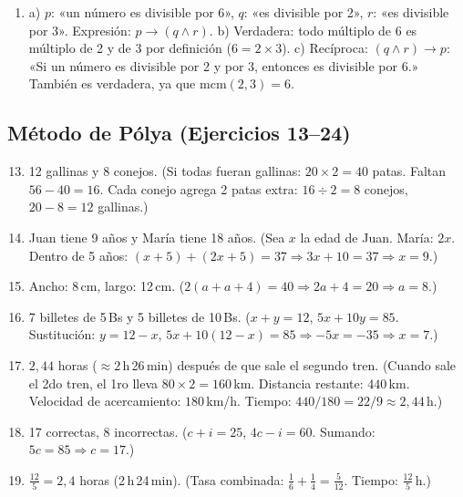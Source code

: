 \documentclass[12pt, a4paper]{article}
\begin{document}
\begin{enumerate}[leftmargin=*, label=\textbf{\arabic*.}]
  \item a) $p$: «un número es divisible por 6», $q$: «es divisible por 2», $r$: «es divisible por 3». Expresión: $p \rightarrow (q \wedge r)$. \quad b) Verdadera: todo múltiplo de 6 es múltiplo de 2 y de 3 por definición ($6 = 2 \times 3$). \quad c) Recíproca: $(q \wedge r) \rightarrow p$: «Si un número es divisible por 2 y por 3, entonces es divisible por 6.» También es verdadera, ya que $\text{mcm}(2,3) = 6$.
\end{enumerate}

\subsection*{Método de Pólya (Ejercicios 13--24)}

\begin{enumerate}[leftmargin=*, label=\textbf{\arabic*.}]
  \setcounter{enumi}{12}
  \item 12 gallinas y 8 conejos. (Si todas fueran gallinas: $20 \times 2 = 40$ patas. Faltan $56 - 40 = 16$. Cada conejo agrega 2 patas extra: $16 \div 2 = 8$ conejos, $20 - 8 = 12$ gallinas.)

  \item Juan tiene 9 años y María tiene 18 años. (Sea $x$ la edad de Juan. María: $2x$. Dentro de 5 años: $(x + 5) + (2x + 5) = 37 \Rightarrow 3x + 10 = 37 \Rightarrow x = 9$.)

  \item Ancho: 8\,cm, largo: 12\,cm. ($2(a + a + 4) = 40 \Rightarrow 2a + 4 = 20 \Rightarrow a = 8$.)

  \item 7 billetes de 5\,Bs y 5 billetes de 10\,Bs. ($x + y = 12$, $5x + 10y = 85$. Sustitución: $y = 12 - x$, $5x + 10(12 - x) = 85 \Rightarrow -5x = -35 \Rightarrow x = 7$.)

  \item $2{,}44$ horas ($\approx 2$\,h\,26\,min) después de que sale el segundo tren. (Cuando sale el 2do tren, el 1ro lleva $80 \times 2 = 160$\,km. Distancia restante: $440$\,km. Velocidad de acercamiento: $180$\,km/h. Tiempo: $440/180 = 22/9 \approx 2{,}44$\,h.)

  \item 17 correctas, 8 incorrectas. ($c + i = 25$, $4c - i = 60$. Sumando: $5c = 85 \Rightarrow c = 17$.)

  \item $\frac{12}{5} = 2{,}4$ horas (2\,h\,24\,min). (Tasa combinada: $\frac{1}{6} + \frac{1}{4} = \frac{5}{12}$. Tiempo: $\frac{12}{5}$\,h.)


\end{enumerate}
\end{document}
